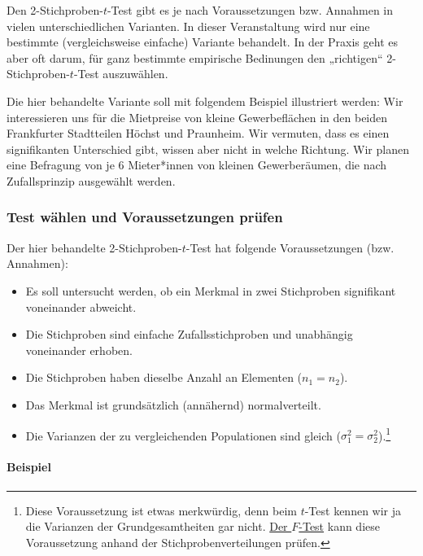\documentclass[
  ngerman,
]{article}
\providecommand{\tightlist}{%
  \setlength{\itemsep}{0pt}\setlength{\parskip}{0pt}}
\begin{document}
Den 2-Stichproben-\(t\)-Test gibt es je nach Voraussetzungen bzw. Annahmen in vielen unterschiedlichen Varianten. In dieser Veranstaltung wird nur eine bestimmte (vergleichsweise einfache) Variante behandelt. In der Praxis geht es aber oft darum, für ganz bestimmte empirische Bedinungen den „richtigen`` 2-Stichproben-\(t\)-Test auszuwählen.

Die hier behandelte Variante soll mit folgendem Beispiel illustriert werden: Wir interessieren uns für die Mietpreise von kleine Gewerbeflächen in den beiden Frankfurter Stadtteilen Höchst und Praunheim. Wir vermuten, dass es einen signifikanten Unterschied gibt, wissen aber nicht in welche Richtung. Wir planen eine Befragung von je 6 Mieter*innen von kleinen Gewerberäumen, die nach Zufallsprinzip ausgewählt werden.

\hypertarget{test-wuxe4hlen-und-voraussetzungen-pruxfcfen-2}{%
\subsubsection{Test wählen und Voraussetzungen prüfen}\label{test-wuxe4hlen-und-voraussetzungen-pruxfcfen-2}}

Der hier behandelte 2-Stichproben-\(t\)-Test hat folgende Voraussetzungen (bzw. Annahmen):

\begin{itemize}
\tightlist
\item
  Es soll untersucht werden, ob ein Merkmal in zwei Stichproben signifikant voneinander abweicht.
\item
  Die Stichproben sind einfache Zufallsstichproben und unabhängig voneinander erhoben.
\item
  Die Stichproben haben dieselbe Anzahl an Elementen (\(n_1=n_2\)).
\item
  Das Merkmal ist grundsätzlich (annähernd) normalverteilt.
\item
  Die Varianzen der zu vergleichenden Populationen sind gleich (\(\sigma^2_1=\sigma^2_2\)).\footnote{Diese Voraussetzung ist etwas merkwürdig, denn beim \(t\)-Test kennen wir ja die Varianzen der Grundgesamtheiten gar nicht. \protect\hyperlink{f}{Der \(F\)-Test} kann diese Voraussetzung anhand der Stichprobenverteilungen prüfen.}
\end{itemize}

\hypertarget{beispiel-11}{%
\paragraph{Beispiel}\label{beispiel-11}}
\end{document}
